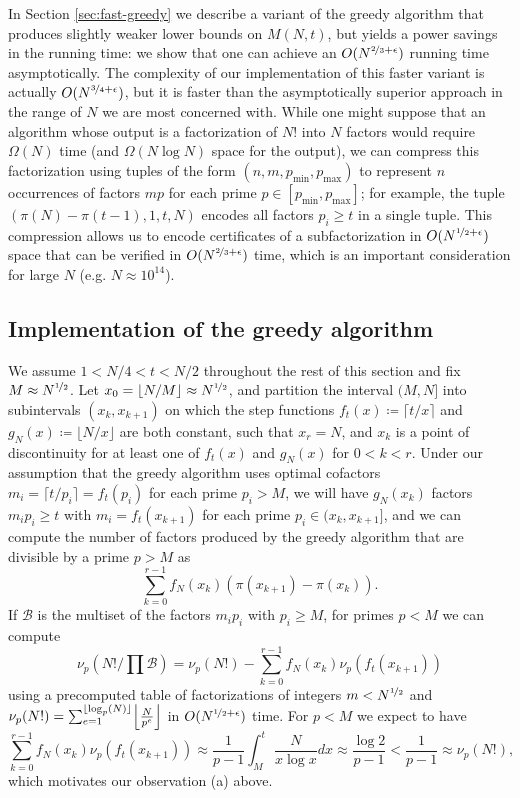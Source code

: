 \documentclass[10pt,a4paper,reqno]{amsart}
\numberwithin{equation}{section}
\theoremstyle{plain}
\theoremstyle{definition}
\newcommand\tuple{{\mathcal B}}
\begin{document}
In Section \ref{sec:fast-greedy} we describe a variant of the greedy algorithm that produces slightly weaker lower bounds on $M(N,t)$, but yields a power savings in the running time: we show that one can achieve an $O(N^{\nicefrac{2}{3}+\epsilon})$ running time asymptotically. The complexity of our implementation of this faster variant is actually $O(N^{\nicefrac{3}{4}+\epsilon})$, but it is faster than the asymptotically superior approach in the range of $N$ we are most concerned with.  While one might suppose that an algorithm whose output is a factorization of $N!$ into $N$ factors would require $\Omega(N)$ time (and $\Omega(N\log N)$ space for the output), we can compress this factorization using tuples of the form $(n,m,p_{\min},p_{\max})$ to represent $n$ occurrences of factors $mp$ for each prime $p\in [p_{\min},p_{\max}]$; for example, the tuple $(\pi(N)-\pi(t-1),1,t,N)$ encodes all factors $p_i\ge t$ in a single tuple.  This compression allows us to encode certificates of a subfactorization in $O(N^{\nicefrac{1}{2}+\epsilon})$ space that can be verified in $O(N^{\nicefrac{2}{3}+\epsilon})$ time, which is an important consideration for large $N$ (e.g. $N\approx 10^{14}$).

\subsection{Implementation of the greedy algorithm}
We assume $1< N/4< t < N/2$ throughout the rest of this section and fix $M \approx N^{\nicefrac{1}{2}}$.
Let $x_0=\lfloor N/M\rfloor \approx N^{\nicefrac{1}{2}}$, and partition the interval $(M,N]$ into subintervals $(x_k,x_{k+1})$ on which the step functions $f_t(x)\coloneqq\lceil t/x\rceil$ and $g_N(x)\coloneqq\lfloor N/x\rfloor$ are both constant, such that $x_r=N$, and $x_k$ is a point of discontinuity for at least one of $f_t(x)$ and $g_N(x)$ for $0<k<r$.  Under our assumption that the greedy algorithm uses optimal cofactors $m_i=\lceil t/p_i\rceil=f_t(p_i)$ for each prime $p_i>M$, we will have $g_N(x_k)$ factors $m_ip_i\ge t$ with $m_i=f_t(x_{k+1})$ for each prime $p_i\in (x_k,x_{k+1}]$, and we can compute the number of factors produced by the greedy algorithm that are divisible by a prime $p>M$ as
\begin{equation}\label{eq:picount}
\sum_{k=0}^{r-1} f_N(x_k)\left(\pi(x_{k+1})-\pi(x_k)\right).
\end{equation}
If $\tuple$ is the multiset of the factors $m_ip_i$ with $p_i\ge M$, for primes $p < M$ we can compute
\begin{equation}\label{eq:rval}
\nu_p\left(N!/\prod \tuple\right) = \nu_p(N!) - \sum_{k=0}^{r-1} f_N(x_k)\nu_p(f_t(x_{k+1}))
\end{equation}
using a precomputed table of factorizations of integers $m < N^{\nicefrac{1}{2}}$ and $\nu_p(N!)=\sum_{e=1}^{\lfloor \log_p(N)\rfloor} \Bigl\lfloor \frac{N}{p^e}\Bigr\rfloor$ in $O(N^{\nicefrac{1}{2}+\epsilon})$ time.  For $p < M$ we expect to have
\[
\sum_{k=0}^{r-1}f_N(x_k)\nu_p(f_t(x_{k+1})) \approx \frac{1}{p-1}\int_M^t \frac{N}{x\log x}dx \approx\frac{\log 2}{p-1} < \frac{1}{p-1} \approx \nu_p(N!),
\]
which motivates our observation (a) above.
\end{document}

